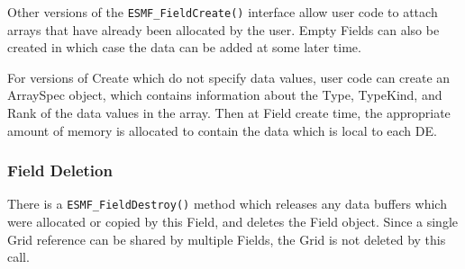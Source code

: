 Other versions of the {\tt ESMF\_FieldCreate()} interface
allow user code to attach arrays that have already been
allocated by the user.  Empty Fields can also be created in
which case the data can be added at some later time.

For versions of Create which do not specify data values,
user code can create an ArraySpec object, which
contains information about the Type, TypeKind, and Rank of the
data values in the array.  Then at Field create time, the
appropriate amount of memory is allocated to contain the
data which is local to each DE.

\subsubsection{Field Deletion}

There is a {\tt ESMF\_FieldDestroy()} method which releases
any data buffers which were allocated or copied by this Field,
and deletes the Field object.  Since a single Grid reference 
can be shared by multiple Fields, the Grid is not deleted by 
this call.
